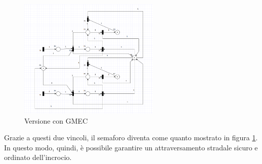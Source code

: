 \begin{figure}[H]
    \centering
    \includegraphics[width=0.6\textwidth]{figure/project_screenshots/semafori_con_controllo.png}
    \caption{Versione con GMEC}
    \label{fig:semafori_gmec}
\end{figure}

Grazie a questi due vincoli, il semaforo diventa come quanto mostrato in figura \ref{fig:semafori_gmec}. In questo modo, quindi, è possibile garantire un attraversamento stradale sicuro e ordinato dell'incrocio.